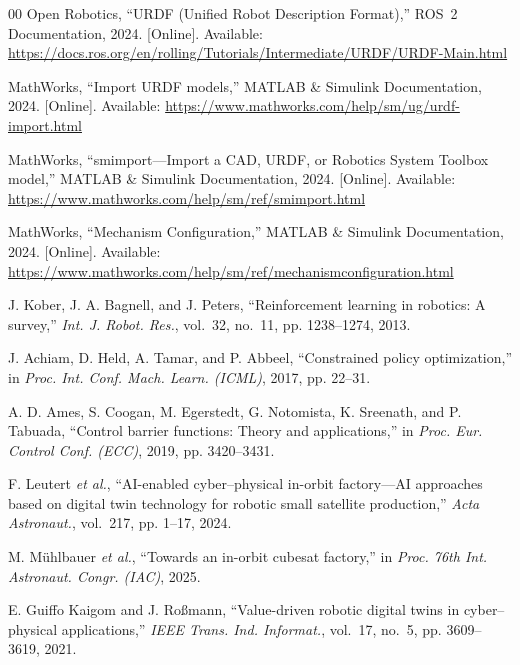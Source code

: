 \documentclass{ieeeaccess}
\begin{document}
\begin{thebibliography}{00}
 Open Robotics, ``URDF (Unified Robot Description Format),'' ROS~2 Documentation,
2024. [Online]. Available:
\url{https://docs.ros.org/en/rolling/Tutorials/Intermediate/URDF/URDF-Main.html}



 MathWorks, ``Import URDF models,'' MATLAB \& Simulink Documentation, 2024. [Online].
Available: \url{https://www.mathworks.com/help/sm/ug/urdf-import.html}



MathWorks, ``smimport---Import a CAD, URDF, or Robotics System Toolbox model,'' MATLAB \& Simulink Documentation,
2024. [Online]. Available: \url{https://www.mathworks.com/help/sm/ref/smimport.html}



 MathWorks, ``Mechanism Configuration,'' MATLAB \& Simulink Documentation, 2024. [Online].
Available: \url{https://www.mathworks.com/help/sm/ref/mechanismconfiguration.html}



J. Kober, J. A. Bagnell, and J. Peters, ``Reinforcement learning in robotics: A survey,''
\emph{Int. J. Robot. Res.}, vol.~32, no.~11, pp. 1238--1274, 2013.



 J. Achiam, D. Held, A. Tamar, and P. Abbeel, ``Constrained policy optimization,'' in
\emph{Proc. Int. Conf. Mach. Learn. (ICML)}, 2017, pp. 22--31.



A. D. Ames, S. Coogan, M. Egerstedt, G. Notomista, K. Sreenath, and P. Tabuada,
``Control barrier functions: Theory and applications,'' in \emph{Proc. Eur. Control Conf. (ECC)}, 2019, pp.
3420--3431.



F. Leutert \emph{et al.}, ``AI-enabled cyber--physical in-orbit factory---AI approaches based on digital twin technology
for robotic small satellite production,'' \emph{Acta Astronaut.}, vol.~217, pp. 1--17, 2024.



 M. M{\"u}hlbauer \emph{et al.}, ``Towards an in-orbit cubesat factory,''
in \emph{Proc. 76th Int. Astronaut. Congr. (IAC)}, 2025.

E. Guiffo Kaigom and J. Roßmann, ``Value-driven robotic digital twins in cyber--physical applications,''
\emph{IEEE Trans. Ind. Informat.}, vol.~17, no.~5, pp. 3609--3619, 2021.


\end{thebibliography}
\end{document}
